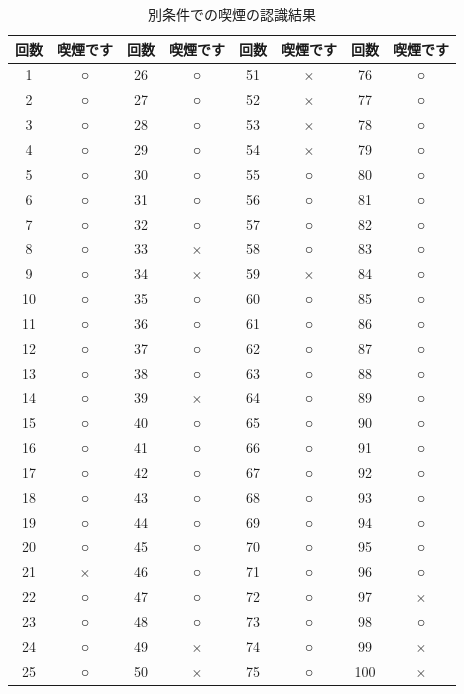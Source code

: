 \documentclass[12pt,oneside]{sotsuken_paper}
\begin{document}
\begin{table}[htb]
\begin{center}
\caption{別条件での喫煙の認識結果}
\begin{tabular}{|c|c|c|c|c|c|c|c|}\hline
回数&喫煙です&回数&喫煙です&回数&喫煙です&回数&喫煙です\\\hline
1&○&26&○&51&$\times$&76&○\\\hline
2&○&27&○&52&$\times$&77&○\\\hline
3&○&28&○&53&$\times$&78&○\\\hline
4&○&29&○&54&$\times$&79&○\\\hline
5&○&30&○&55&○&80&○\\\hline
6&○&31&○&56&○&81&○\\\hline
7&○&32&○&57&○&82&○\\\hline
8&○&33&$\times$&58&○&83&○\\\hline
9&○&34&$\times$&59&$\times$&84&○\\\hline
10&○&35&○&60&○&85&○\\\hline
11&○&36&○&61&○&86&○\\\hline
12&○&37&○&62&○&87&○\\\hline
13&○&38&○&63&○&88&○\\\hline
14&○&39&$\times$&64&○&89&○\\\hline
15&○&40&○&65&○&90&○\\\hline
16&○&41&○&66&○&91&○\\\hline
17&○&42&○&67&○&92&○\\\hline
18&○&43&○&68&○&93&○\\\hline
19&○&44&○&69&○&94&○\\\hline
20&○&45&○&70&○&95&○\\\hline
21&$\times$&46&○&71&○&96&○\\\hline
22&○&47&○&72&○&97&$\times$\\\hline
23&○&48&○&73&○&98&○\\\hline
24&○&49&$\times$&74&○&99&$\times$\\\hline
25&○&50&$\times$&75&○&100&$\times$
\\\hline
\end{tabular}
\label{tab:another-smokrecogresult}
\end{center}
\end{table}
\end{document}
